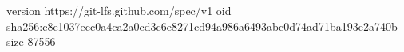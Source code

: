 version https://git-lfs.github.com/spec/v1
oid sha256:c8e1037ecc0a4ca2a0cd3c6e8271cd94a986a6493abc0d74ad71ba193e2a740b
size 87556
